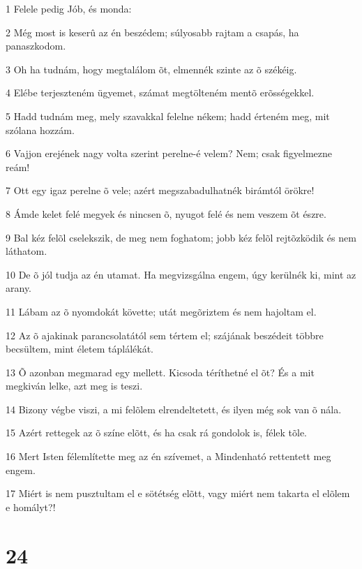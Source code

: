 \par 1 Felele pedig Jób, és monda:
\par 2 Még most is keserû az én beszédem; súlyosabb rajtam a csapás, ha panaszkodom.
\par 3 Oh ha tudnám, hogy megtalálom õt, elmennék szinte az õ székéig.
\par 4 Elébe terjeszteném ügyemet, számat megtölteném mentõ erõsségekkel.
\par 5 Hadd tudnám meg, mely szavakkal felelne nékem; hadd érteném meg, mit szólana hozzám.
\par 6 Vajjon erejének nagy volta szerint perelne-é velem? Nem; csak figyelmezne reám!
\par 7 Ott egy igaz perelne õ vele; azért megszabadulhatnék birámtól örökre!
\par 8 Ámde kelet felé megyek és nincsen õ, nyugot felé és nem veszem õt észre.
\par 9 Bal kéz felõl cselekszik, de meg nem foghatom; jobb kéz felõl rejtõzködik és nem láthatom.
\par 10 De õ jól tudja az én utamat. Ha megvizsgálna engem, úgy kerülnék ki, mint az arany.
\par 11 Lábam az õ nyomdokát követte; utát megõriztem és nem hajoltam el.
\par 12 Az õ ajakinak parancsolatától sem tértem el; szájának beszédeit többre becsültem, mint életem táplálékát.
\par 13 Õ azonban megmarad egy mellett. Kicsoda téríthetné el õt? És a mit megkiván lelke, azt meg is teszi.
\par 14 Bizony végbe viszi, a mi felõlem elrendeltetett, és ilyen még sok van õ nála.
\par 15 Azért rettegek az õ színe elõtt, és ha csak rá gondolok is, félek tõle.
\par 16 Mert Isten félemlítette meg az én szívemet, a Mindenható rettentett meg engem.
\par 17 Miért is nem pusztultam el e sötétség elõtt, vagy miért nem takarta el elõlem e homályt?!

\chapter{24}

